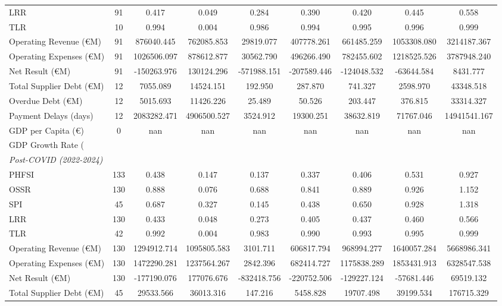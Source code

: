 \begin{table}[htbp]
\begin{tabular}{lcccccccc}
LRR & 91 & 0.417 & 0.049 & 0.284 & 0.390 & 0.420 & 0.445 & 0.558 \\
TLR & 10 & 0.994 & 0.004 & 0.986 & 0.994 & 0.995 & 0.996 & 0.999 \\
Operating Revenue (€M) & 91 & 876040.445 & 762085.853 & 29819.077 & 407778.261 & 661485.259 & 1053308.080 & 3214187.367 \\
Operating Expenses (€M) & 91 & 1026506.097 & 878612.877 & 30562.790 & 496266.490 & 782455.602 & 1218525.526 & 3787948.240 \\
Net Result (€M) & 91 & -150263.976 & 130124.296 & -571988.151 & -207589.446 & -124048.532 & -63644.584 & 8431.777 \\
Total Supplier Debt (€M) & 12 & 7055.089 & 14524.151 & 192.950 & 287.870 & 741.327 & 2598.970 & 43348.518 \\
Overdue Debt (€M) & 12 & 5015.693 & 11426.226 & 25.489 & 50.526 & 203.447 & 376.815 & 33314.327 \\
Payment Delays (days) & 12 & 2083282.471 & 4906500.527 & 3524.912 & 19300.251 & 38632.819 & 71767.046 & 14941541.167 \\
GDP per Capita (€) & 0 & nan & nan & nan & nan & nan & nan & nan \\
GDP Growth Rate (%
\\
\multicolumn{9}{l}{\textit{Post-COVID (2022-2024)}} \\
PHFSI & 133 & 0.438 & 0.147 & 0.137 & 0.337 & 0.406 & 0.531 & 0.927 \\
OSSR & 130 & 0.888 & 0.076 & 0.688 & 0.841 & 0.889 & 0.926 & 1.152 \\
SPI & 45 & 0.687 & 0.327 & 0.145 & 0.438 & 0.650 & 0.928 & 1.318 \\
LRR & 130 & 0.433 & 0.048 & 0.273 & 0.405 & 0.437 & 0.460 & 0.566 \\
TLR & 42 & 0.992 & 0.004 & 0.983 & 0.990 & 0.993 & 0.995 & 0.999 \\
Operating Revenue (€M) & 130 & 1294912.714 & 1095805.583 & 3101.711 & 606817.794 & 968994.277 & 1640057.284 & 5668986.341 \\
Operating Expenses (€M) & 130 & 1472290.281 & 1237564.267 & 2842.396 & 682414.727 & 1175838.289 & 1853431.913 & 6328547.538 \\
Net Result (€M) & 130 & -177190.076 & 177076.676 & -832418.756 & -220752.506 & -129227.124 & -57681.446 & 69519.132 \\
Total Supplier Debt (€M) & 45 & 29533.566 & 36013.316 & 147.216 & 5458.828 & 19707.498 & 39199.534 & 176715.329 \\

\end{tabular}
\end{table}
